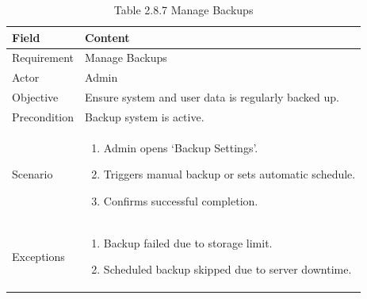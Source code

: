 \documentclass[12pt,oneside]{report}
\begin{document}
\begin{table}[H]
\centering
\caption{Table 2.8.7 Manage Backups}
\label{tab:admin-manage-backups}
\begin{tabularx}{\textwidth}{|p{3cm}|X|}
\hline
\textbf{Field} & \textbf{Content} \\ \hline

Requirement & Manage Backups \\ \hline

Actor & Admin \\ \hline

Objective & Ensure system and user data is regularly backed up. \\ \hline

Precondition & Backup system is active. \\ \hline

Scenario &
\begin{minipage}[t]{0.75\textwidth}
\begin{enumerate}[leftmargin=*,label=\arabic*.]
\item Admin opens ‘Backup Settings’.
\item Triggers manual backup or sets automatic schedule.
\item Confirms successful completion.
\end{enumerate}
\end{minipage} \\ \hline

Exceptions &
\begin{minipage}[t]{0.75\textwidth}
\begin{enumerate}[leftmargin=*,label=\arabic*.]
\item Backup failed due to storage limit.
\item Scheduled backup skipped due to server downtime.
\end{enumerate}
\end{minipage} \\ \hline

\end{tabularx}
\end{table}
\end{document}
